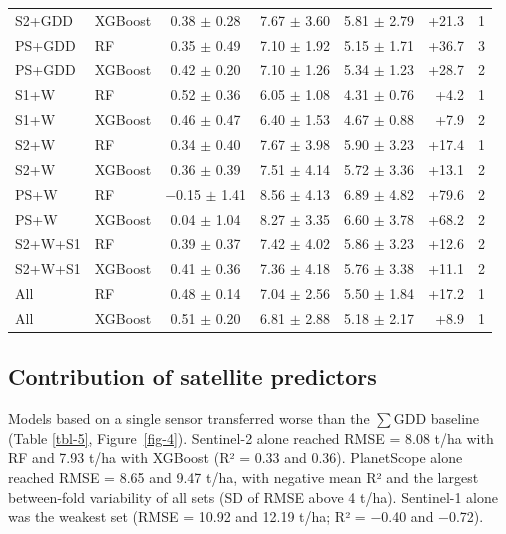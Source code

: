 \documentclass[
  english,
  review,
  number,
  sort,compress,
  authoryear,
  3p]{elsarticle}
\begin{document}
\begin{table}
{\begin{tabular}{l l c c c r c}
S2+GDD & XGBoost & 0.38 $\pm$ 0.28 & 7.67 $\pm$ 3.60 & 5.81 $\pm$ 2.79 & +21.3 & 1 \\
PS+GDD & RF & 0.35 $\pm$ 0.49 & 7.10 $\pm$ 1.92 & 5.15 $\pm$ 1.71 & +36.7 & 3 \\
PS+GDD & XGBoost & 0.42 $\pm$ 0.20 & 7.10 $\pm$ 1.26 & 5.34 $\pm$ 1.23 & +28.7 & 2 \\
\midrule
S1+W & RF & 0.52 $\pm$ 0.36 & 6.05 $\pm$ 1.08 & 4.31 $\pm$ 0.76 & +4.2 & 1 \\
S1+W & XGBoost & 0.46 $\pm$ 0.47 & 6.40 $\pm$ 1.53 & 4.67 $\pm$ 0.88 & +7.9 & 2 \\
S2+W & RF & 0.34 $\pm$ 0.40 & 7.67 $\pm$ 3.98 & 5.90 $\pm$ 3.23 & +17.4 & 1 \\
S2+W & XGBoost & 0.36 $\pm$ 0.39 & 7.51 $\pm$ 4.14 & 5.72 $\pm$ 3.36 & +13.1 & 2 \\
PS+W & RF & $-$0.15 $\pm$ 1.41 & 8.56 $\pm$ 4.13 & 6.89 $\pm$ 4.82 & +79.6 & 2 \\
PS+W & XGBoost & 0.04 $\pm$ 1.04 & 8.27 $\pm$ 3.35 & 6.60 $\pm$ 3.78 & +68.2 & 2 \\
S2+W+S1 & RF & 0.39 $\pm$ 0.37 & 7.42 $\pm$ 4.02 & 5.86 $\pm$ 3.23 & +12.6 & 2 \\
S2+W+S1 & XGBoost & 0.41 $\pm$ 0.36 & 7.36 $\pm$ 4.18 & 5.76 $\pm$ 3.38 & +11.1 & 2 \\
\midrule
All & RF & 0.48 $\pm$ 0.14 & 7.04 $\pm$ 2.56 & 5.50 $\pm$ 1.84 & +17.2 & 1 \\
All & XGBoost & 0.51 $\pm$ 0.20 & 6.81 $\pm$ 2.88 & 5.18 $\pm$ 2.17 & +8.9 & 1 \\
\bottomrule
\end{tabular}

}

\end{table}%

\subsection{Contribution of satellite
predictors}\label{contribution-of-satellite-predictors}

Models based on a single sensor transferred worse than the \(\sum\)GDD
baseline (Table \ref{tbl-5}, Figure~\ref{fig-4}). Sentinel-2 alone
reached RMSE = 8.08 t/ha with RF and 7.93 t/ha with XGBoost (R² = 0.33
and 0.36). PlanetScope alone reached RMSE = 8.65 and 9.47 t/ha, with
negative mean R² and the largest between-fold variability of all sets
(SD of RMSE above 4 t/ha). Sentinel-1 alone was the weakest set (RMSE =
10.92 and 12.19 t/ha; R² = −0.40 and −0.72).
\end{document}
